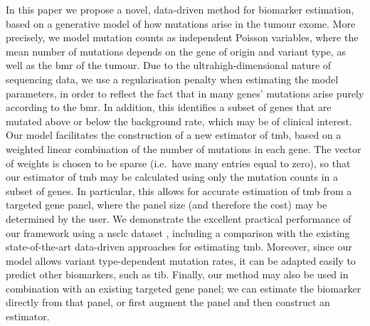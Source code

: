 \documentclass[12pt]{article}
\begin{document}
In this paper we propose a novel, data-driven method for biomarker estimation, based on a generative model of how mutations arise in the tumour exome.  More precisely, we model mutation counts as independent Poisson variables, where the mean number of mutations depends on the gene of origin and variant type, as well as the \acrfull{bmr} of the tumour. Due to the ultrahigh-dimensional nature of sequencing data, we use a regularisation penalty when estimating the model parameters, in order to reflect the fact that in many genes' mutations arise purely according to the \acrshort{bmr}. In addition, this identifies a subset of genes that are mutated above or below the background rate, which may be of clinical interest. Our model facilitates the construction of a new estimator of \acrshort{tmb}, based on a weighted linear combination of the number of mutations in each gene. The vector of weights is chosen to be sparse (i.e.~have many entries equal to zero), so that our estimator of \acrshort{tmb} may be calculated using only the mutation counts in a subset of genes. In particular, this allows for accurate estimation of \acrshort{tmb} from a targeted gene panel, where the panel size (and therefore the cost) may be determined by the user.  We demonstrate the excellent practical performance of our framework using a \acrfull{nsclc} dataset \citep{chalmers_analysis_2017}, including a comparison with the existing state-of-the-art data-driven approaches for estimating \acrshort{tmb}.   %
Moreover, since our model allows variant type-dependent mutation rates, it can be adapted easily to predict other biomarkers, such as \acrshort{tib}. Finally, our method may also be used in combination with an existing targeted gene panel; we can estimate the biomarker directly from that panel, or first augment the panel and then construct an estimator.  %

\end{document}
